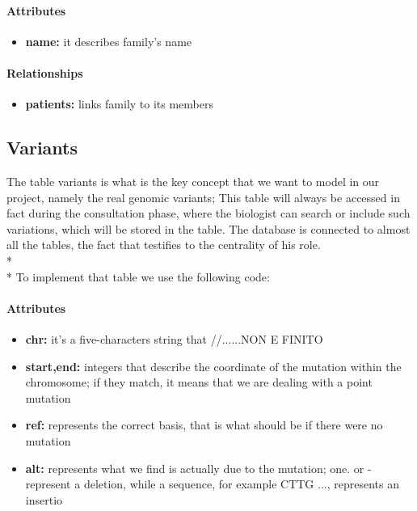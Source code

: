 \paragraph{Attributes}      
\begin{itemize}
 	\item \textbf{name:} it describes family's name
\end{itemize}

\paragraph{Relationships}   
\begin{itemize}
 	\item \textbf{patients:} links family to its members
\end{itemize}

\subsection{Variants}
The table variants is what is the key concept that we want to model in our project, namely the real genomic variants; This table will always be accessed in fact during the consultation phase, where the biologist can search or include such variations, which will be stored in the table. The database is connected to almost all the tables, the fact that testifies to the centrality of his role. \\*\\*
To implement that table we use the following code:


 
\newpage

\paragraph{Attributes}      
\begin{itemize}
 	\item \textbf{chr:}  it's a five-characters string that //......NON E FINITO
 	\item \textbf{start,end:} integers that describe the coordinate of the mutation within the chromosome; 			if they match, it means that we are dealing with a point mutation
	 \item \textbf{ref:} represents the correct basis, that is what should be  if there were no mutation
   	\item \textbf{alt:} represents what we find is actually due to the mutation; one. or - represent a 				deletion, while a sequence, for example CTTG ..., represents an insertio
\end{itemize}

